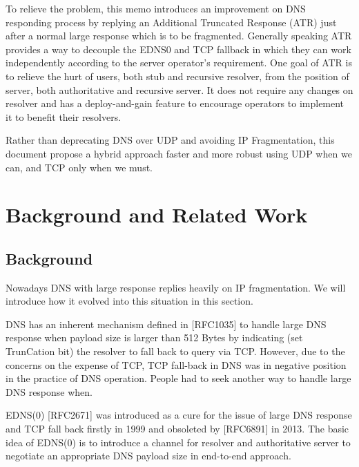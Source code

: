 To relieve the problem, this memo introduces an improvement on
DNS responding process by replying an Additional Truncated Response
(ATR) just after a normal large response which is to be fragmented.
Generally speaking ATR provides a way to decouple the EDNS0 and TCP
fallback in which they can work independently according to the server
operator's requirement.  One goal of ATR is to relieve the hurt of
users, both stub and recursive resolver, from the position of server,
both authoritative and recursive server.  It does not require any
changes on resolver and has a deploy-and-gain feature to encourage
operators to implement it to benefit their resolvers.

Rather than deprecating DNS over UDP and avoiding IP Fragmentation, 
this document propose a hybrid approach faster and more robust using 
UDP when we can, and TCP only when we must.



\section{Background and Related Work}

\subsection{Background}

   Nowadays DNS with large response replies heavily on IP fragmentation. 
   We will introduce how it evolved into this situation in this section.
   
   DNS has an inherent mechanism defined in [RFC1035] to handle large
   DNS response when payload size is larger than 512 Bytes by 
   indicating (set TrunCation bit) the resolver to fall back to query 
   via TCP.  However, due to the concerns on the expense of TCP, 
   TCP fall-back in DNS was in negative position in the practice of 
   DNS operation. People had to seek another way to handle large DNS 
   response when.

   EDNS(0) [RFC2671] was introduced as a cure for the issue of large DNS
   response and TCP fall back firstly in 1999 and obsoleted by [RFC6891]
   in 2013.  The basic idea of EDNS(0) is to introduce a channel for
   resolver and authoritative server to negotiate an appropriate DNS
   payload size in end-to-end approach.

